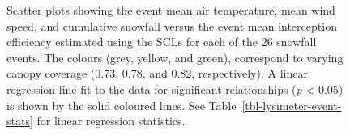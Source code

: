 \documentclass[
  letterpaper,
  DIV=11,
  numbers=noendperiod]{scrartcl}
\begin{document}
\begin{figure}


\caption{\label{fig-scl-ip-avg-event}Scatter plots showing the event
mean air temperature, mean wind speed, and cumulative snowfall versus
the event mean interception efficiency estimated using the SCLs for each
of the 26 snowfall events. The colours (grey, yellow, and green),
correspond to varying canopy coverage (0.73, 0.78, and 0.82,
respectively). A linear regression line fit to the data for significant
relationships (\emph{p} \textless{} 0.05) is shown by the solid coloured
lines. See Table~\ref{tbl-lysimeter-event-stats} for linear regression
statistics.}

\end{figure}%
\end{document}
